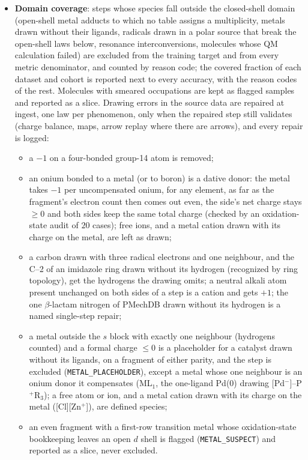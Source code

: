 \documentclass[11pt,a4paper]{article}
\begin{document}
\begin{itemize}[nosep]
\item \textbf{Domain coverage}: steps whose species fall outside the closed-shell domain (open-shell metal adducts to which no table assigns a multiplicity, metals drawn without their ligands, radicals drawn in a polar source that break the open-shell laws below, resonance interconversions, molecules whose QM calculation failed) are excluded from the training target and from every metric denominator, and counted by reason code; the covered fraction of each dataset and cohort is reported next to every accuracy, with the reason codes of the rest. Molecules with smeared occupations are kept as flagged samples and reported as a slice. Drawing errors in the source data are repaired at ingest, one law per phenomenon, only when the repaired step still validates (charge balance, maps, arrow replay where there are arrows), and every repair is logged:
\begin{itemize}[nosep]
\item a $-1$ on a four-bonded group-14 atom is removed;
\item an onium bonded to a metal (or to boron) is a dative donor: the metal takes $-1$ per uncompensated onium, for any element, as far as the fragment's electron count then comes out even, the side's net charge stays $\ge0$ and both sides keep the same total charge (checked by an oxidation-state audit of $20$ cases); free ions, and a metal cation drawn with its charge on the metal, are left as drawn;
\item a carbon drawn with three radical electrons and one neighbour, and the C--2 of an imidazole ring drawn without its hydrogen (recognized by ring topology), get the hydrogens the drawing omits; a neutral alkali atom present unchanged on both sides of a step is a cation and gets $+1$; the one $\beta$-lactam nitrogen of PMechDB drawn without its hydrogen is a named single-step repair;
\item a metal outside the $s$ block with exactly one neighbour (hydrogens counted) and a formal charge $\le0$ is a placeholder for a catalyst drawn without its ligands, on a fragment of either parity, and the step is excluded (\texttt{METAL\_PLACEHOLDER}), except a metal whose one neighbour is an onium donor it compensates (ML$_1$, the one-ligand Pd(0) drawing [Pd$^-$]--P$^+$R$_3$); a free atom or ion, and a metal cation drawn with its charge on the metal ([Cl][Zn$^+$]), are defined species;
\item an even fragment with a first-row transition metal whose oxidation-state bookkeeping leaves an open $d$ shell is flagged (\texttt{METAL\_SUSPECT}) and reported as a slice, never excluded.

\end{itemize}
\end{itemize}
\end{document}
